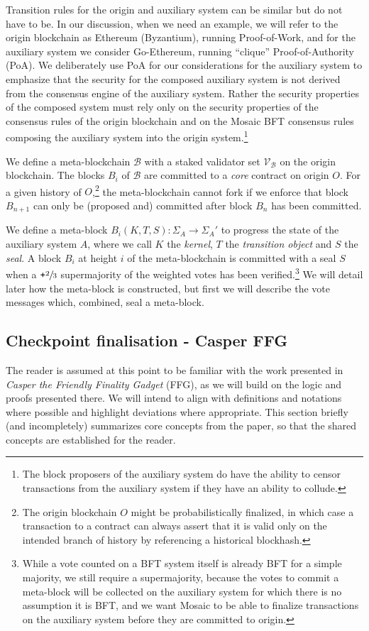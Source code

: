 \documentclass[12pt,a4paper]{article}
\begin{document}
Transition rules for the origin and auxiliary system can be similar but do not have to be.
In our discussion, when we need an example, we will refer to the origin blockchain as Ethereum (Byzantium), running Proof-of-Work, and for the auxiliary system we consider Go-Ethereum, running ``clique'' Proof-of-Authority (PoA).
We deliberately use PoA for our considerations for the auxiliary system to emphasize that the security for the composed auxiliary system is not derived from the consensus engine of the auxiliary system.
Rather the security properties of the composed system must rely only on the security properties of the consensus rules of the origin blockchain and on the Mosaic BFT consensus rules composing the auxiliary system into the origin system.\footnote{
	The block proposers of the auxiliary system do have the ability to censor transactions from the auxiliary system if they have an ability to collude.
}


We define a meta-blockchain $\mathcal{B}$ with a staked validator set $\mathcal{V}_\mathcal{B}$ on the origin blockchain. The blocks $B_i$ of $\mathcal{B}$ are committed to a \emph{core} contract on origin $O$.
For a given history of $O$,\footnote{
	The origin blockchain $O$ might be probabilistically finalized, in which case a transaction to a contract can always assert that it is valid only on the intended branch of history by referencing a historical blockhash.
}
the meta-blockchain cannot fork if we enforce that block $B_{n+1}$ can only be (proposed and) committed after block $B_n$ has been committed.

We define a meta-block $B_i(K, T, S): \Sigma_A \rightarrow \Sigma_A'$ to progress the state of the auxiliary system $A$, where we call $K$ the \emph{kernel}, $T$ the \emph{transition object} and $S$ the \emph{seal}.
A block $B_i$ at height $i$ of the meta-blockchain is committed with a seal $S$ when a $\texttt{+}\sfrac{2}{3}$ supermajority of the weighted votes has been verified.\footnote{
	While a vote counted on a BFT system itself is already BFT for a simple majority, %
	we still require a supermajority, because the votes to commit a meta-block will be collected on the auxiliary system for which there is no assumption it is BFT, and we want Mosaic to be able to finalize transactions on the auxiliary system before they are committed to origin.
}
We will detail later how the meta-block is constructed, but first we will describe the vote messages which, combined, seal a meta-block.

\subsection{Checkpoint finalisation - Casper FFG}
The reader is assumed at this point to be familiar with the work presented in \textit{Casper the Friendly Finality Gadget}\cite{casperffg} (FFG), as we will build on the logic and proofs presented there.
We will intend to align with definitions and notations where possible and highlight deviations where appropriate.
This section briefly (and incompletely) summarizes core concepts from the paper, so that the shared concepts are established for the reader.
\end{document}
